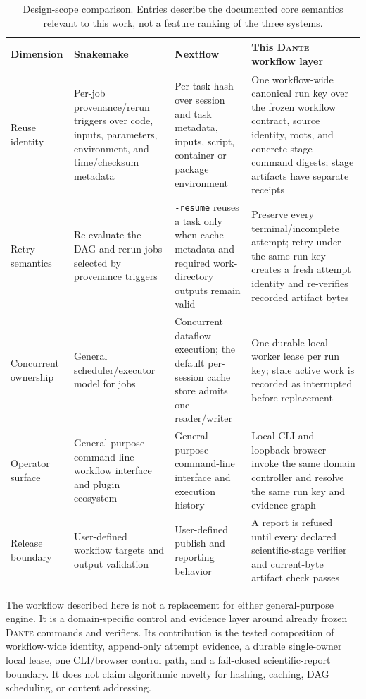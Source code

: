 \documentclass[aps,prd,twocolumn,superscriptaddress,nofootinbib,amsmath,amssymb,floatfix,10pt]{revtex4-2}
\newcommand{\dante}{\textsc{Dante}}
\begin{document}
\begin{table}[t]
\caption{Design-scope comparison.  Entries describe the documented core
semantics relevant to this work, not a feature ranking of the three systems.}
\label{tab:comparison}
\begin{ruledtabular}
\begin{tabular}{p{}p{}p{}p{}}
Dimension & Snakemake & Nextflow & This \dante{} workflow layer \\
\hline
Reuse identity & Per-job provenance/rerun triggers over code, inputs,
parameters, environment, and time/checksum metadata & Per-task hash over
session and task metadata, inputs, script, container or package environment &
One workflow-wide canonical run key over the frozen workflow contract, source
identity, roots, and concrete stage-command digests; stage artifacts have
separate receipts \\
Retry semantics & Re-evaluate the DAG and rerun jobs selected by provenance
triggers & \texttt{-resume} reuses a task only
when cache metadata and required work-directory outputs remain valid & Preserve
every terminal/incomplete attempt; retry under the same run key creates a fresh
attempt identity and re-verifies recorded artifact bytes \\
Concurrent ownership & General scheduler/executor model for jobs & Concurrent
dataflow execution; the default per-session cache store admits one
reader/writer & One durable local worker lease per run key; stale active work is
recorded as interrupted before replacement \\
Operator surface & General-purpose command-line workflow interface and plugin
ecosystem & General-purpose command-line interface and execution history &
Local CLI and loopback browser invoke the same domain controller and resolve
the same run key and evidence graph \\
Release boundary & User-defined workflow targets and output validation &
User-defined publish and reporting behavior & A report is refused until every
declared scientific-stage verifier and current-byte artifact check passes \\
\end{tabular}
\end{ruledtabular}
\end{table}

The workflow described here is not a replacement for either general-purpose
engine.  It is a domain-specific control and evidence layer around already
frozen \dante{} commands and verifiers.  Its contribution is the tested
composition of workflow-wide identity, append-only attempt evidence, a durable
single-owner local lease, one CLI/browser control path, and a fail-closed
scientific-report boundary.  It does not claim algorithmic novelty for hashing,
caching, DAG scheduling, or content addressing.
\end{document}
